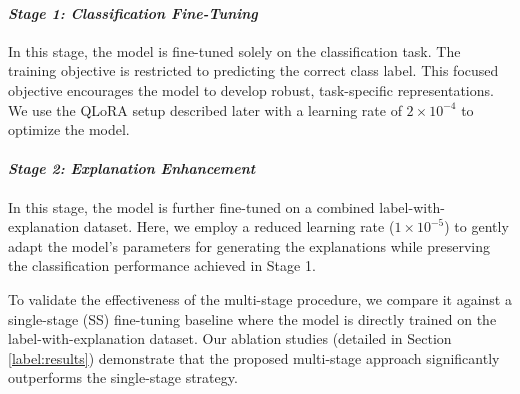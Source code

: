 \noindent
\paragraph{\textit{Stage 1: Classification Fine-Tuning}} In this stage, the model is fine-tuned solely on the classification task. The training objective is restricted to predicting the correct class label. This focused objective encourages the model to develop robust, task-specific representations. We use the QLoRA setup described later with a learning rate of $2\times10^{-4}$ to optimize the model.
\noindent
\paragraph{\textit{Stage 2: Explanation Enhancement}} In this stage, the model is further fine-tuned on a combined label-with-explanation dataset. Here, we employ a reduced learning rate ($1\times10^{-5}$) to gently adapt the model’s parameters for generating the explanations while preserving the classification performance achieved in Stage 1.

To validate the effectiveness of the multi-stage procedure, we compare it against a single-stage (SS) fine-tuning baseline where the model is directly trained on the label-with-explanation dataset. Our ablation studies (detailed in Section \ref{label:results}) demonstrate that the proposed multi-stage approach significantly outperforms the single-stage strategy.





